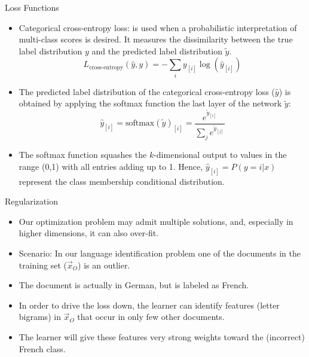 \documentclass[handout]{beamer}
\begin{document}
\begin{frame}{Loss Functions}
\begin{scriptsize}
\begin{itemize}

 \item Categorical cross-entropy loss:  is used when a probabilistic interpretation of multi-class scores is desired. It measures the dissimilarity between the true label distribution $y$ and the predicted label distribution $\tilde{y}$. 
   \begin{displaymath}
  L_{\text{cross-entropy}}(\hat{y},y) = - \sum_{i} y_{[i]} \log(\hat{y}_{[i]})   
 \end{displaymath}
\item The predicted label distribution of the categorical cross-entropy loss ($\hat{y}$) is obtained by applying the softmax function the last layer of the network $\tilde{y}$:
    \begin{displaymath}
\hat{y}_{[i]} = \text{softmax}(\tilde{y})_{[i]} =  \frac{e^{\tilde{y}_{[i]}}}{\sum_{j}e^{\tilde{y}_{[j]}}}   
 \end{displaymath}
 
\item The softmax function squashes the $k$-dimensional output to values in the range (0,1) with all entries adding up to 1. Hence, $\hat{y}_{[i]} = P( y = i |x)$ represent the class membership conditional distribution.
 
\end{itemize}
\end{scriptsize}


\end{frame}





\begin{frame}{Regularization}
\begin{scriptsize}
\begin{itemize}
 \item Our optimization problem may admit multiple solutions, and, especially in higher dimensions, it can also over-fit.
 \item Scenario: In our language identification problem one of the documents in the training set ($\vec{x}_O$) is an outlier.
 \item The document is actually in German, but is labeled as French.
 
 \item In order to drive the loss down, the learner can identify features (letter bigrams) in $\vec{x}_O$ that occur in only few other documents.
 
 \item The learner will give these features very strong weights toward the (incorrect) French class. 

\end{itemize}
\end{scriptsize}

\end{frame}
\end{document}
